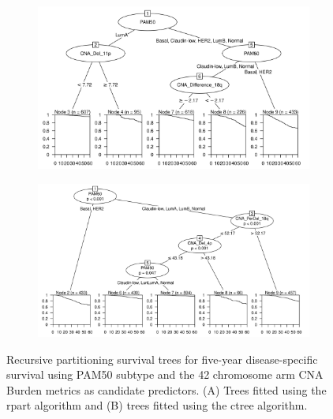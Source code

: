 \begin{figure}[!h]
\centering

\vspace{0.5cm}

\begin{subfigure}{\textwidth}
\subcaption{}
\includegraphics[width=1\textwidth]{../figures/Chapter_3/PA_PartyKit_Survival_Burden_FiveYearDSS_PAM50.png}
\end{subfigure}

\vspace{2cm}

\begin{subfigure}{\textwidth}
\subcaption{}
\includegraphics[width=1\textwidth]{../figures/Chapter_3/PA_Ctree_Survival_Burden_FiveYearDSS_PAM50.png}
\end{subfigure}

\vspace{0.5cm}

\caption[Recursive partitioning survival trees for five-year disease-specific survival using PAM50 subtype and the 42 chromosome arm CNA Burden metrics as candidate predictors.]{Recursive partitioning survival trees for five-year disease-specific survival using PAM50 subtype and the 42 chromosome arm CNA Burden metrics as candidate predictors. (A) Trees fitted using the rpart algorithm and (B) trees fitted using the ctree algorithm.}
\label{fig:PAM50_PA_CNA_Burden_FiveYearDSS}
\end{figure}

